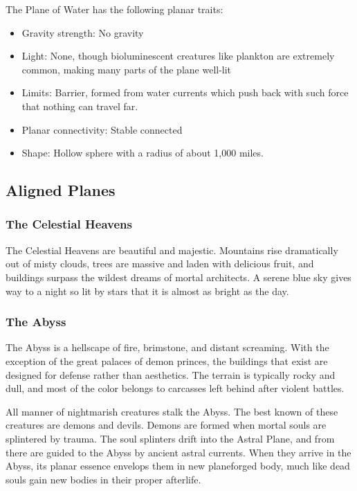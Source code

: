       The Plane of Water has the following planar traits:
      \begin{itemize}
        \item Gravity strength: No gravity
        \item Light: None, though bioluminescent creatures like plankton are extremely common, making many parts of the plane well-lit
        \item Limits: Barrier, formed from water currents which push back with such force that nothing can travel far.
        \item Planar connectivity: Stable connected
        \item Shape: Hollow sphere with a radius of about 1,000 miles.
      \end{itemize}

  \subsection{Aligned Planes}\label{Aligned Planes}

    \subsubsection{The Celestial Heavens}
      The Celestial Heavens are beautiful and majestic.
      Mountains rise dramatically out of misty clouds, trees are massive and laden with delicious fruit, and buildings surpass the wildest dreams of mortal architects.
      A serene blue sky gives way to a night so lit by stars that it is almost as bright as the day.

    \subsubsection{The Abyss}
      The Abyss is a hellscape of fire, brimstone, and distant screaming.
      With the exception of the great palaces of demon princes, the buildings that exist are designed for defense rather than aesthetics.
      The terrain is typically rocky and dull, and most of the color belongs to carcasses left behind after violent battles.

      All manner of nightmarish creatures stalk the Abyss.
      The best known of these creatures are demons and devils.
      Demons are formed when mortal souls are splintered by trauma.
      The soul splinters drift into the Astral Plane, and from there are guided to the Abyss by ancient astral currents.
      When they arrive in the Abyss, its planar essence envelops them in new planeforged body, much like dead souls gain new bodies in their proper afterlife.

